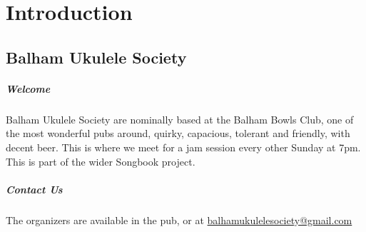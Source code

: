\chapter{Introduction}\label{ch:introduction}
\section{Balham Ukulele Society} %
\label{sec:balham_ukulele_society}

\paragraph{Welcome} %
\label{par:welcome}
Balham Ukulele Society are nominally based at the Balham Bowls Club, one of the most wonderful pubs around, quirky, capacious, tolerant and friendly, with decent beer. This is where we meet for a jam session every other Sunday at 7pm. This is part of the wider Songbook project.

\paragraph{Contact Us} %
\label{par:contact_us}
The organizers are available in the pub, or at \href{mailto:balhamukulelesociety@gmail.com}{balhamukulelesociety@gmail.com}

